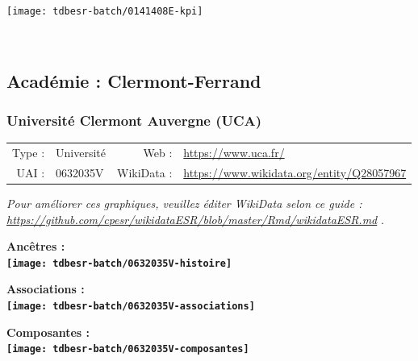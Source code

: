 \documentclass[12pt,french,]{article}
\begin{document}
\begin{center}\texttt{[image: tdbesr-batch/0141408E-kpi]} \end{center}\checkoddpage

\ifoddpage \fi ~\newpage  

\hypertarget{acaduxe9mie-clermont-ferrand}{%
\subsection{Académie :
Clermont-Ferrand}\label{acaduxe9mie-clermont-ferrand}}

\hypertarget{universituxe9-clermont-auvergne-uca}{%
\subsubsection{Université Clermont Auvergne
(UCA)}\label{universituxe9-clermont-auvergne-uca}}

\begin{tabular*}{\textwidth}{rp{5cm}rl}  
\hline  
Type : & Université & Web : &\href{https://www.uca.fr/}{https://www.uca.fr/} \\  
UAI : & 0632035V & WikiData : & \href{https://www.wikidata.org/entity/Q28057967}{https://www.wikidata.org/entity/Q28057967} \\  
\hline  
\end{tabular*}

\textit{\scriptsize Pour améliorer ces graphiques, veuillez éditer WikiData selon ce guide :  \href{https://github.com/cpesr/wikidataESR/blob/master/Rmd/wikidataESR.md}{https://github.com/cpesr/wikidataESR/blob/master/Rmd/wikidataESR.md}}
.

\vspace{1cm}  
\begin{minipage}[b]{0.50\textwidth}\begin{center} \bf Ancêtres : \\  
\texttt{[image: tdbesr-batch/0632035V-histoire]} \end{center}\end{minipage}\begin{minipage}[b]{0.50\textwidth}\begin{center} \bf Associations : \\  
\texttt{[image: tdbesr-batch/0632035V-associations]} \end{center}\end{minipage}

\hrulefill

\begin{center} \bf Composantes : \\  
\texttt{[image: tdbesr-batch/0632035V-composantes]} \end{center}
\end{document}
